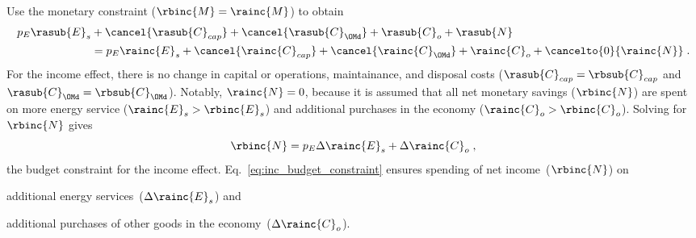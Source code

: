 \begin{landscape}
{Use the monetary constraint ($\rbinc{M} = \rainc{M}$) to obtain
%
\begin{align}
  p_E \rasub{E}_s &+ \cancel{\rasub{C}_{cap}} + \cancel{\rasub{C}_{\OMd}} + \rasub{C}_o + \rasub{N} \nonumber \\
                  &= p_E \rainc{E}_s + \cancel{\rainc{C}_{cap}} + \cancel{\rainc{C}_{\OMd}} + \rainc{C}_o + \cancelto{0}{\rainc{N}} \; .
\end{align}
%
For the income effect, there is no change in capital or operations, maintainance, and disposal costs
($\rasub{C}_{cap} = \rbsub{C}_{cap}$ and $\rasub{C}_{\OMd} = \rbsub{C}_{\OMd}$).
Notably, $\rainc{N} = 0$,
because it is assumed that all net monetary savings ($\rbinc{N}$) are spent on
more energy service ($\rainc{E}_s > \rbinc{E}_s$)
and
additional purchases in the economy ($\rainc{C}_o > \rbinc{C}_o$).
Solving for $\rbinc{N}$ gives 
%
\begin{equation} \label{eq:inc_budget_constraint}
  \rbinc{N} = p_E \Delta \rainc{E}_s + \Delta \rainc{C}_o \; ,
\end{equation}
%
the budget constraint for the income effect.
Eq.~\ref{eq:inc_budget_constraint} ensures
spending of net income~($\rbinc{N}$) on
%
\begin{enumerate*}[label={(\alph*)}]
	
  \item additional energy services~($\Delta \rainc{E}_s$) and
  
  \item additional purchases of other goods in the economy~($\Delta \rainc{C}_o$).
    
\end{enumerate*}
}
\end{landscape}

